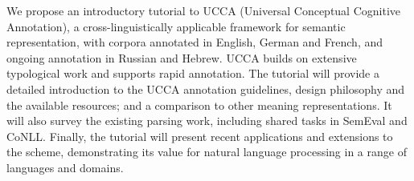 We propose an introductory tutorial to UCCA (Universal Conceptual Cognitive Annotation), a cross-linguistically applicable framework for semantic representation, with corpora annotated in English, German and French, and ongoing annotation in Russian and Hebrew. UCCA builds on extensive typological work and supports rapid annotation. The tutorial will provide a detailed introduction to the UCCA annotation guidelines, design philosophy and the available resources; and a comparison to other meaning representations. It will also survey the existing parsing work, including shared tasks in SemEval and CoNLL. Finally, the tutorial will present recent applications and extensions to the scheme, demonstrating its value for natural language processing in a range of languages and domains.
